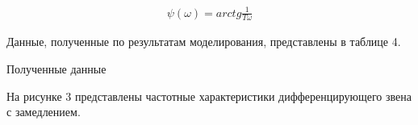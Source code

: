 \documentclass[a4paper, 11pt]{article}
\begin{document}
\begin{align}
	\psi(\omega)=arctg\frac{1}{T\omega}
\end{align}

\par 
Данные, полученные по результатам моделирования, представлены в таблице 4.

\newpage
\begin{table}[h!]
    \begin{threeparttable}
        \caption{Полученные данные} \label{tab:perflogcross}
    \end{threeparttable}
\end{table}

\newpage
\par 
На рисунке 3 представлены частотные характеристики дифференцирующего звена с замедлением.
\end{document}
